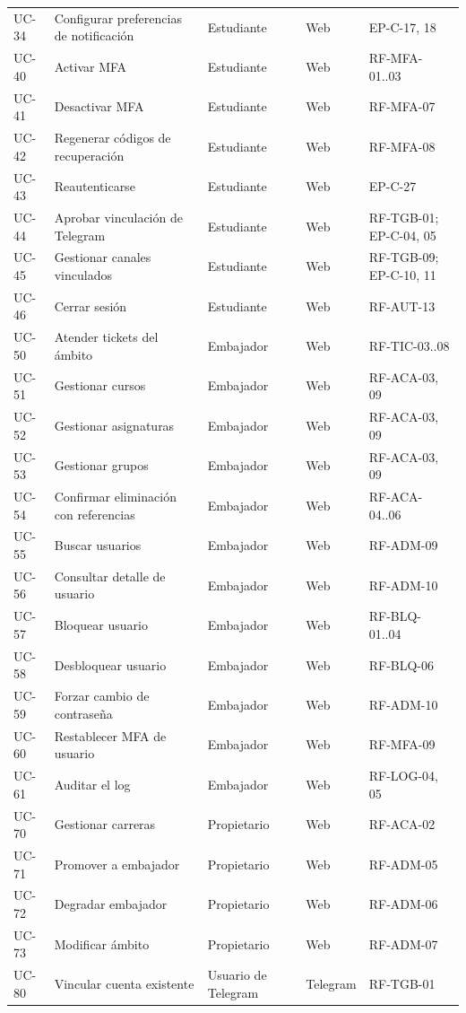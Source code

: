\documentclass[11pt,a4paper]{report}
\begin{document}
\begin{center}
\begin{longtable}{@{}lp{6.0cm}p{3.2cm}p{1.7cm}p{3.0cm}@{}}
UC-34 & Configurar preferencias de notificación & Estudiante & Web & EP-C-17, 18\\
UC-40 & Activar MFA & Estudiante & Web & RF-MFA-01..03\\
UC-41 & Desactivar MFA & Estudiante & Web & RF-MFA-07\\
UC-42 & Regenerar códigos de recuperación & Estudiante & Web & RF-MFA-08\\
UC-43 & Reautenticarse & Estudiante & Web & EP-C-27\\
UC-44 & Aprobar vinculación de Telegram & Estudiante & Web & RF-TGB-01; EP-C-04, 05\\
UC-45 & Gestionar canales vinculados & Estudiante & Web & RF-TGB-09; EP-C-10, 11\\
UC-46 & Cerrar sesión & Estudiante & Web & RF-AUT-13\\
UC-50 & Atender tickets del ámbito & Embajador & Web & RF-TIC-03..08\\
UC-51 & Gestionar cursos & Embajador & Web & RF-ACA-03, 09\\
UC-52 & Gestionar asignaturas & Embajador & Web & RF-ACA-03, 09\\
UC-53 & Gestionar grupos & Embajador & Web & RF-ACA-03, 09\\
UC-54 & Confirmar eliminación con referencias & Embajador & Web & RF-ACA-04..06\\
UC-55 & Buscar usuarios & Embajador & Web & RF-ADM-09\\
UC-56 & Consultar detalle de usuario & Embajador & Web & RF-ADM-10\\
UC-57 & Bloquear usuario & Embajador & Web & RF-BLQ-01..04\\
UC-58 & Desbloquear usuario & Embajador & Web & RF-BLQ-06\\
UC-59 & Forzar cambio de contraseña & Embajador & Web & RF-ADM-10\\
UC-60 & Restablecer MFA de usuario & Embajador & Web & RF-MFA-09\\
UC-61 & Auditar el log & Embajador & Web & RF-LOG-04, 05\\
UC-70 & Gestionar carreras & Propietario & Web & RF-ACA-02\\
UC-71 & Promover a embajador & Propietario & Web & RF-ADM-05\\
UC-72 & Degradar embajador & Propietario & Web & RF-ADM-06\\
UC-73 & Modificar ámbito & Propietario & Web & RF-ADM-07\\
UC-80 & Vincular cuenta existente & Usuario de Telegram & Telegram & RF-TGB-01\\

\end{longtable}
\end{center}
\end{document}
